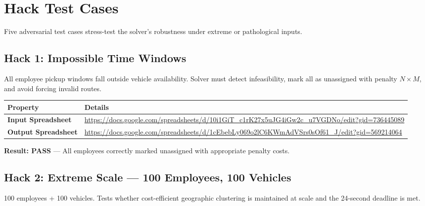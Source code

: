 \documentclass[11pt,a4paper]{article}
\begin{document}
\section{Hack Test Cases}
\label{sec:hack}

Five adversarial test cases stress-test the solver's robustness under extreme or pathological inputs.

\subsection{Hack 1: Impossible Time Windows}

\begin{hackbox}
All employee pickup windows fall outside vehicle availability. Solver must detect infeasibility, mark all as unassigned with penalty $N \times M$, and avoid forcing invalid routes.
\end{hackbox}

\begin{table}[H]
\centering
\small
\begin{tabular}{p{3.5cm}p{10cm}}
\toprule
\textbf{Property} & \textbf{Details} \\
\midrule
\rowcolor{rowalt}
\textbf{Input Spreadsheet} & \scriptsize\url{https://docs.google.com/spreadsheets/d/10i1GiT_c1rK27x5uJG4iGw2c_u7VGDNo/edit?gid=736445089} \\
\textbf{Output Spreadsheet} & \scriptsize\url{https://docs.google.com/spreadsheets/d/1cEbebLy069o2lC6KWmAdVSrs0sOf61_J/edit?gid=569214064} \\
\bottomrule
\end{tabular}
\end{table}

\begin{resultbox}
\textbf{Result: \textcolor{velgreen}{PASS}} --- All employees correctly marked unassigned with appropriate penalty costs.
\end{resultbox}

\subsection{Hack 2: Extreme Scale --- 100 Employees, 100 Vehicles}

\begin{hackbox}
100 employees + 100 vehicles. Tests whether cost-efficient geographic clustering is maintained at scale and the 24-second deadline is met.
\end{hackbox}
\end{document}
